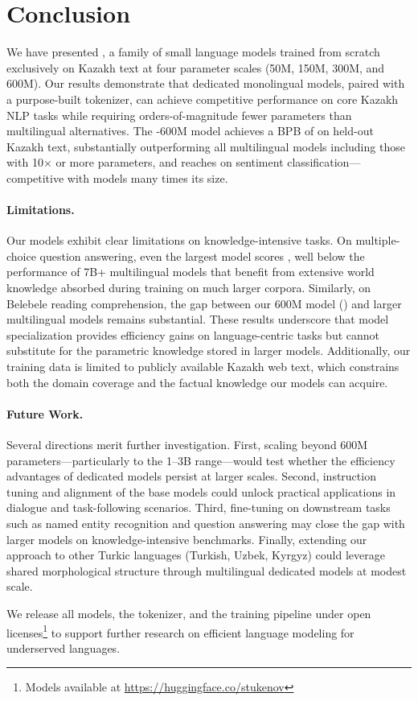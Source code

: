 \section{Conclusion}
\label{sec:conclusion}

We have presented \sozkz{}, a family of small language models trained
from scratch exclusively on Kazakh text at four parameter scales
(50M, 150M, 300M, and 600M).  Our results demonstrate that dedicated
monolingual models, paired with a purpose-built tokenizer, can achieve
competitive performance on core Kazakh NLP tasks while requiring
orders-of-magnitude fewer parameters than multilingual alternatives.
The \sozkz{}-600M model achieves a BPB of \bpbSozKZSixHundredM{} on
held-out Kazakh text, substantially outperforming all multilingual
models including those with 10$\times$ or more parameters, and reaches
\accSentimentSozKZSixHundredM{} on sentiment classification---competitive
with models many times its size.

\paragraph{Limitations.}
Our models exhibit clear limitations on knowledge-intensive tasks.
On multiple-choice question answering, even the largest \sozkz{} model
scores \accMcQaSozKZSixHundredM{}, well below the performance of
7B+ multilingual models that benefit from extensive world knowledge
absorbed during training on much larger corpora.  Similarly, on
Belebele reading comprehension, the gap between our 600M model
(\accBelebeleSozKZSixHundredM{}) and larger multilingual models
remains substantial.  These results underscore that model
specialization provides efficiency gains on language-centric tasks
but cannot substitute for the parametric knowledge stored in larger
models.  Additionally, our training data is limited to publicly
available Kazakh web text, which constrains both the domain coverage
and the factual knowledge our models can acquire.

\paragraph{Future Work.}
Several directions merit further investigation.  First, scaling
beyond 600M parameters---particularly to the 1--3B range---would test
whether the efficiency advantages of dedicated models persist at
larger scales.  Second, instruction tuning and alignment of the base
models could unlock practical applications in dialogue and
task-following scenarios.  Third, fine-tuning on downstream tasks such
as named entity recognition and question answering may close the gap
with larger models on knowledge-intensive benchmarks.  Finally,
extending our approach to other Turkic languages (Turkish, Uzbek,
Kyrgyz) could leverage shared morphological structure through
multilingual dedicated models at modest scale.

We release all \sozkz{} models, the tokenizer, and the training
pipeline under open licenses\footnote{Models available at
\url{https://huggingface.co/stukenov}} to support further research
on efficient language modeling for underserved languages.
